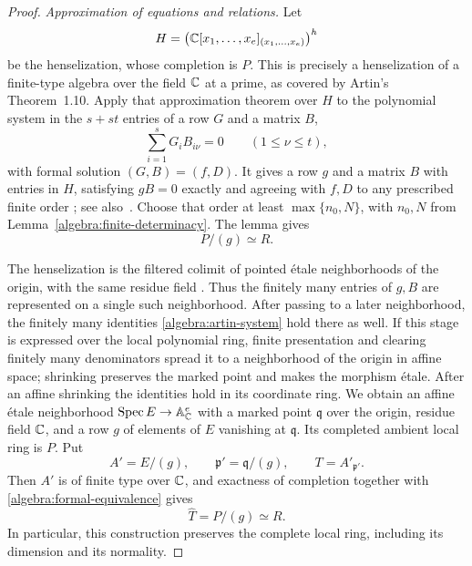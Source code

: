 \begin{proof}
\emph{Approximation of equations and relations.}
Let
\[
 H=\bigl(\mathbb C[x_1,\ldots,x_e]_{(x_1,\ldots,x_e)}\bigr)^h
\]
be the henselization, whose completion is $P$.  This is precisely a
henselization of a finite-type algebra over the field $\mathbb C$ at a prime,
as covered by Artin's Theorem~1.10.  Apply that approximation theorem
over $H$ to the polynomial system in the $s+st$ entries of a row $G$
and a matrix $B$,
\begin{equation}
\label{algebra:artin-system}
 \sum_{i=1}^s G_i B_{i\nu}=0\qquad(1\le\nu\le t),
\end{equation}
with formal solution $(G,B)=(f,D)$.  It gives a row $g$ and a matrix $B$
with entries in $H$, satisfying $gB=0$ exactly and agreeing with $f,D$
to any prescribed finite order
\cite[Theorem~1.10]{Artin1969}; see also~\cite{StacksApproximation}.  Choose that
order at least $\max\{n_0,N\}$, with $n_0,N$ from
Lemma~\ref{algebra:finite-determinacy}.  The lemma gives
\begin{equation}
\label{algebra:formal-equivalence}
 P/(g)\simeq R.
\end{equation}

The henselization is the filtered colimit of pointed \'etale
neighborhoods of the origin, with the same residue field
\cite{StacksHenselization}.  Thus the finitely many entries of $g,B$
are represented on a single such neighborhood.  After passing to a
later neighborhood, the finitely many identities
\eqref{algebra:artin-system} hold there as well.  If this stage is
expressed over the local polynomial ring, finite presentation and
clearing finitely many denominators spread it to a neighborhood of
the origin in affine space; shrinking preserves the marked point
and makes the morphism \'etale.  After an affine shrinking the
identities hold in its coordinate ring.  We obtain an affine
\'etale neighborhood $\operatorname{Spec} E\to\mathbb A^e_{\mathbb C}$ with a marked point
$\mathfrak q$ over the origin, residue field $\mathbb C$, and a row $g$ of
elements of $E$ vanishing at $\mathfrak q$.  Its completed ambient
local ring is $P$.  Put
\[
 A'=E/(g),\qquad \mathfrak p'=\mathfrak q/(g),\qquad
 T=A'_{\mathfrak p'}.
\]
Then $A'$ is of finite type over $\mathbb C$, and exactness of completion
together with \eqref{algebra:formal-equivalence} gives
\begin{equation}
\label{algebra:completed-local-ring}
 \widehat T=P/(g)\simeq R.
\end{equation}
In particular, this construction preserves the complete local ring,
including its dimension and its normality.


\end{proof}
